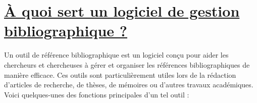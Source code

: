 \documentclass[
  letterpaper,
]{scrbook}
\begin{document}
\hypertarget{uxe0-quoi-sert-un-logiciel-de-gestion-bibliographique}{%
\section{\texorpdfstring{\ul{À quoi sert un logiciel de gestion
bibliographique
?}}{À quoi sert un logiciel de gestion bibliographique ?}}\label{uxe0-quoi-sert-un-logiciel-de-gestion-bibliographique}}

Un outil de référence bibliographique est un logiciel conçu pour aider
les chercheurs et chercheuses à gérer et organiser les références
bibliographiques de manière efficace. Ces outils sont particulièrement
utiles lors de la rédaction d'articles de recherche, de thèses, de
mémoires ou d'autres travaux académiques. Voici quelques-unes des
fonctions principales d'un tel outil :
\end{document}
